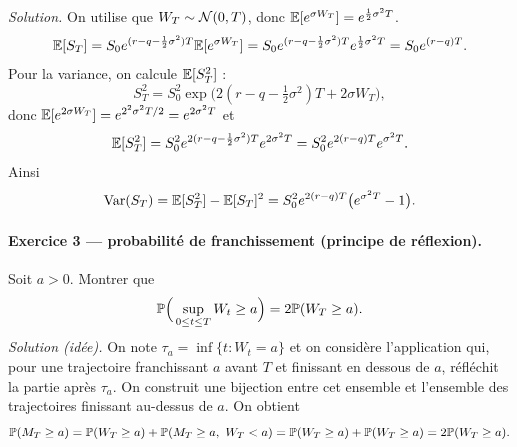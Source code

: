 \emph{Solution.}
On utilise que $W_T\sim\mathcal{N}(0,T)$, donc $\mathbb{E}[e^{\sigma W_T}]=e^{\frac12\sigma^2T}$.
\[
\mathbb{E}[S_T]
=S_0e^{(r-q-\frac12\sigma^2)T}\mathbb{E}[e^{\sigma W_T}]
=S_0e^{(r-q-\frac12\sigma^2)T}e^{\frac12\sigma^2T}
=S_0e^{(r-q)T}.
\]
Pour la variance, on calcule $\mathbb{E}[S_T^2]$ :
\[
S_T^2=S_0^2\exp\Big(2(r-q-\tfrac12\sigma^2)T+2\sigma W_T\Big),
\]
donc $\mathbb{E}[e^{2\sigma W_T}]=e^{2^2\sigma^2T/2}=e^{2\sigma^2T}$ et
\[
\mathbb{E}[S_T^2]=S_0^2e^{2(r-q-\frac12\sigma^2)T}e^{2\sigma^2T}
=S_0^2e^{2(r-q)T}e^{\sigma^2T}.
\]
Ainsi
\[
\mathrm{Var}(S_T)=\mathbb{E}[S_T^2]-\mathbb{E}[S_T]^2
=S_0^2e^{2(r-q)T}\bigl(e^{\sigma^2T}-1\bigr).
\]

\paragraph{Exercice 3 --- probabilité de franchissement (principe de réflexion).}
Soit $a>0$. Montrer que
\[
\mathbb{P}\Big(\sup_{0\le t\le T} W_t\ge a\Big)=2\mathbb{P}(W_T\ge a).
\]
\emph{Solution (idée).}
On note $\tau_a=\inf\{t:W_t=a\}$ et on considère l'application qui, pour une trajectoire franchissant $a$ avant $T$ et finissant en dessous de $a$, réfléchit la partie après $\tau_a$.
On construit une bijection entre cet ensemble et l'ensemble des trajectoires finissant au-dessus de $a$.
On obtient
\[
\mathbb{P}(M_T\ge a)=\mathbb{P}(W_T\ge a)+\mathbb{P}(M_T\ge a,\ W_T<a)
=\mathbb{P}(W_T\ge a)+\mathbb{P}(W_T\ge a)=2\mathbb{P}(W_T\ge a).
\]
